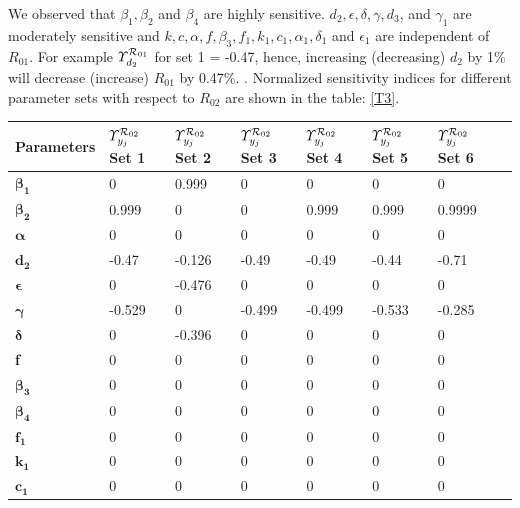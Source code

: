 \noindent We observed that $\beta_{1}, \beta_{2}$ and $\beta_{4}$ are highly sensitive. $d_{2}, \epsilon, \delta, \gamma, d_{3}$, and $\gamma_{1}$ are moderately sensitive and $k, c, \alpha,f, \beta_{3}, f_{1}, k_{1}, c_{1}, \alpha_{1}, \delta_{1}$  and $\epsilon_{1}$ are independent of $R_{01}$. For example $\varUpsilon^{{{\cal R}}_{01}}_{d_{2}}$ for set 1 = -0.47, hence,
increasing (decreasing) $d_{2}$ by 1\% will decrease (increase) $R_{01}$  by 0.47\%.
\newpage
{}. Normalized sensitivity indices for different parameter sets with respect to $R_{02}$ are shown in the table: \ref{T3}.\\
\begin{table}
\centering
    \begin{tabular}{|p{3cm}|p{1.6cm}|p{1.6cm}|p{1.6cm}|p{1.6cm}|p{1.6cm}|p{1.6cm}|p{1.6cm}|}
    \hline
               Parameters      & \textbf{$\varUpsilon^{{{\cal R}}_{02}}_{y_j}$ Set 1} & \textbf{$\varUpsilon^{{{\cal R}}_{02}}_{y_j}$ Set 2} & \textbf{$\varUpsilon^{{{\cal R}}_{02}}_{y_j}$ Set 3} & \textbf{$\varUpsilon^{{{\cal R}}_{02}}_{y_j}$ Set 4} & \textbf{$\varUpsilon^{{{\cal R}}_{02}}_{y_j}$ Set 5} & \textbf{$\varUpsilon^{{{\cal R}}_{02}}_{y_j}$ Set 6} \\
            \hline
  $\boldsymbol {\beta_{1}} $                 & 0 & 0.999 & 0 & 0 & 0 & 0  \\
  $\boldsymbol {\beta_{2}} $      & 0.999 & 0 & 0 & 0.999 & 0.999 & 0.9999  \\
  $\boldsymbol{\alpha}$          & 0 & 0 & 0 & 0 & 0 & 0  \\
  $\mathbf {d _{2} }$           & -0.47 & -0.126 & -0.49 & -0.49 & -0.44 & -0.71  \\
  $\boldsymbol{\epsilon}$           & 0 & -0.476 & 0 & 0 & 0 & 0  \\
  $\boldsymbol{\gamma}$               & -0.529 & 0 & -0.499 & -0.499 & -0.533 & -0.285  \\
  $\boldsymbol{\delta}$        & 0 & -0.396 & 0 & 0 & 0 & 0  \\
  \textbf{f}          & 0 & 0 & 0 & 0 & 0 & 0  \\
  $\boldsymbol {\beta_{3}}$          & 0 & 0 & 0 & 0 & 0 & 0  \\
  $\boldsymbol {\beta_{4}}$             & 0 & 0 & 0 & 0 & 0 & 0  \\
  $\mathbf{f_{1} } $         & 0 & 0 & 0 & 0 & 0 & 0  \\
  $\mathbf{k_{1} }  $        & 0 & 0 & 0 & 0 & 0 & 0  \\
  $\mathbf{c_{1} } $         & 0 & 0 & 0 & 0 & 0 & 0  \\

\end{tabular}
\end{table}
